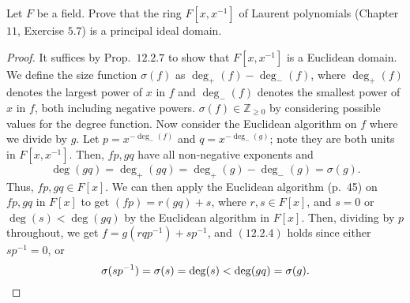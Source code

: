 \documentclass[12pt]{article}
\theoremstyle{remark}
\begin{document}
\setcounter{subsubsection}{8}
\begin{problem}
  Let $F$ be a field. Prove that the ring $F[x,x^{-1}]$ of Laurent polynomials (Chapter $11$, Exercise $5.7$) is a principal ideal domain.
\end{problem}
\begin{proof}
  It suffices by Prop.~$12.2.7$ to show that $F[x,x^{-1}]$ is a Euclidean domain. We define the size function $\sigma(f)$ as $\deg_+(f) - \deg_-(f)$, where $\deg_+(f)$ denotes the largest power of $x$ in $f$ and $\deg_-(f)$ denotes the smallest power of $x$ in $f$, both including negative powers. $\sigma(f) \in \mathbb{Z}_{\ge 0}$ by considering possible values for the degree function. Now consider the Euclidean algorithm on $f$ where we divide by $g$. Let $p = x^{-\deg_-(f)}$ and $q = x^{-\deg_-(g)}$; note they are both units in $F[x,x^{-1}]$. Then, $fp,gq$ have all non-negative exponents and
  \begin{equation*}
    \deg(gq) = \deg_+(gq) = \deg_+(g) - \deg_-(g) = \sigma(g).
  \end{equation*}
  Thus, $fp,gq \in F[x]$. We can then apply the Euclidean algorithm (p.~45) on $fp,gq$ in $F[x]$ to get $(fp) = r(gq) + s$, where $r,s \in F[x]$, and $s=0$ or $\deg(s) < \deg(gq)$ by the Euclidean algorithm in $F[x]$. Then, dividing by $p$ throughout, we get $f = g(rqp^{-1}) + sp^{-1}$, and $(12.2.4)$ holds since either $sp^{-1} = 0$, or
  \begin{equation*}
    \sigma(sp^{-1}) = \sigma(s) = \deg(s) < \deg(gq) = \sigma(g).\qedhere
  \end{equation*}
\end{proof}
\end{document}
